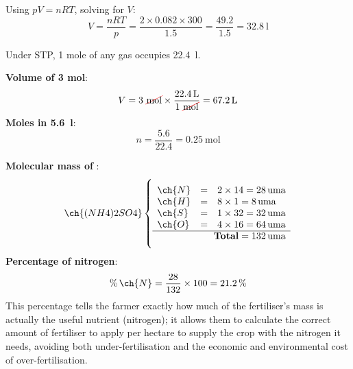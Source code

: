 \documentclass[11pt,a4paper]{article}
\begin{document}
\begin{solucioneng}
Using $pV = nRT$, solving for $V$:
\begin{equation*}
    V = \dfrac{nRT}{p} = \dfrac{2 \times 0.082 \times 300}{1.5} = \dfrac{49.2}{1.5} = \qty{32.8}{\litre}
\end{equation*}
\end{solucioneng}

\begin{solucioneng}
Under STP, 1 mole of any gas occupies \qty{22.4}{\litre}.

\textbf{Volume of 3 mol}:
\begin{equation*}
    V = 3\ \cancelred{\unit{\mole}} \times \dfrac{\qty{22.4}{\litre}}{1\ \cancelred{\unit{\mole}}} = \qty{67.2}{\litre}
\end{equation*}
\textbf{Moles in \qty{5.6}{\litre}}:
\begin{equation*}
    n = \dfrac{5.6}{22.4} = \qty{0.25}{\mole}
\end{equation*}
\end{solucioneng}

\begin{solucioneng}
\textbf{Molecular mass of }:
\[
    \ch{(NH4)2SO4} \left\{\rule{0pt}{1.4cm}
        \begin{array}{lcl}
            \ch{N} &=& 2 \times 14 = 28\,\text{uma} \\
            \ch{H} &=& 8 \times 1 = 8\,\text{uma} \\
            \ch{S} &=& 1 \times 32 = 32\,\text{uma} \\
            \ch{O} &=& 4 \times 16 = 64\,\text{uma} \\
            \cline{1-3}
            \multicolumn{3}{r}{\textbf{Total} = 132\,\text{uma}}
        \end{array}
    \right.
\]
\textbf{Percentage of nitrogen}:
\begin{equation*}
    \%\,\ch{N} = \dfrac{28}{132}\times 100 = 21.2\,\%
\end{equation*}
This percentage tells the farmer exactly how much of the fertiliser's mass is actually the useful nutrient (nitrogen); it allows them to calculate the correct amount of fertiliser to apply per hectare to supply the crop with the nitrogen it needs, avoiding both under-fertilisation and the economic and environmental cost of over-fertilisation.
\end{solucioneng}

\newpage
\end{document}
